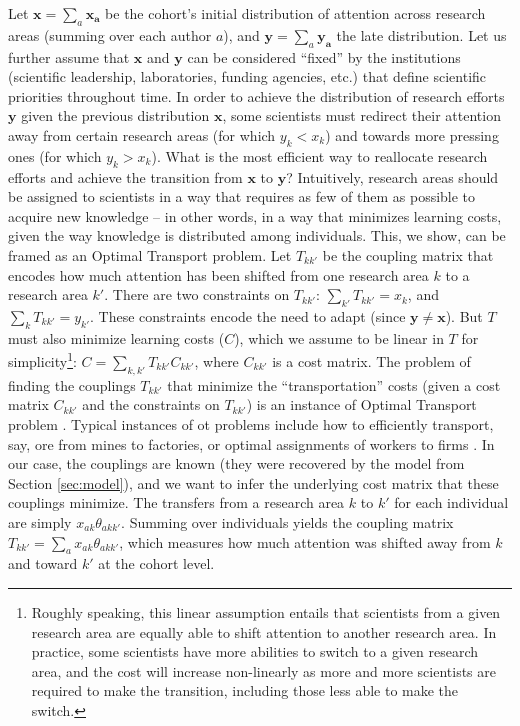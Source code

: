 \documentclass{article}
\begin{document}
Let $\bm{x}=\sum_a \bm{x_a}$ be the cohort's initial distribution of attention across research areas (summing over each author $a$), and $\bm{y}=\sum_a \bm{y_a}$ the late distribution. Let us further assume that $\bm{x}$ and $\bm{y}$ can be considered ``fixed'' by the institutions (scientific leadership, laboratories, funding agencies, etc.) that define scientific priorities throughout time. In order to achieve the distribution of research efforts $\bm{y}$ given the previous distribution $\bm{x}$, some scientists must redirect their attention away from certain research areas (for which $y_k<x_k$) and towards more pressing ones (for which $y_k>x_k$). What is the most efficient way to reallocate research efforts and achieve the transition from $\bm{x}$ to $\bm{y}$? Intuitively, research areas should be assigned to scientists in a way that requires as few of them as possible to acquire new knowledge -- in other words, in a way that minimizes learning costs, given the way knowledge is distributed among individuals. This, we show, can be framed as an Optimal Transport problem. Let $T_{kk'}$ be the coupling matrix that encodes how much attention has been shifted from one research area $k$ to a research area $k'$. There are two constraints on $T_{kk'}$: $\sum_{k'} T_{kk'} = x_k$, and $\sum_{k} T_{kk'} = y_{k'}$. These constraints encode the need to adapt (since $\bm{y}\neq \bm{x}$). But $T$ must also minimize learning costs ($C$), which we assume to be linear in $T$ for simplicity\footnote{Roughly speaking, this linear assumption entails that scientists from a given research area are equally able to shift attention to another research area. In practice, some scientists have more abilities to switch to a given research area, and the cost will increase non-linearly as more and more scientists are required to make the transition, including those less able to make the switch.}: $C=\sum_{k,k'}T_{kk'}C_{kk'}$, where $C_{kk'}$ is a cost matrix. The problem of finding the couplings $T_{kk'}$ that minimize the ``transportation'' costs (given a cost matrix $C_{kk'}$ and the constraints on $T_{kk'}$) is an instance of Optimal Transport problem \citep{Peyr2019}. Typical instances of \gls{ot} problems include how to efficiently transport, say, ore from mines to factories, or optimal assignments of workers to firms \citep{galichon2018optimal}. In our case, the couplings are known (they were recovered by the model from Section \ref{sec:model}), and we want to infer the underlying cost matrix that these couplings minimize. The transfers from a research area $k$ to $k'$ for each individual are simply $x_{ak}\theta_{akk'}$. Summing over individuals yields the coupling matrix $T_{kk'}=\sum_a x_{ak} \theta_{akk'}$, which measures how much attention was shifted away from $k$ and toward $k'$ at the cohort level.
\end{document}
